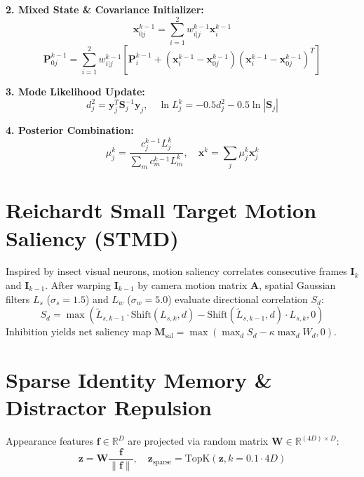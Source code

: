 \documentclass[10pt,journal,compsoc]{IEEEtran}
\begin{document}
\textbf{2. Mixed State \& Covariance Initializer:}
\begin{equation}
\mathbf{x}_{0j}^{k-1} = \sum_{i=1}^2 w_{i|j}^{k-1} \mathbf{x}_i^{k-1}
\end{equation}
\begin{equation}
\mathbf{P}_{0j}^{k-1} = \sum_{i=1}^2 w_{i|j}^{k-1} \left[ \mathbf{P}_i^{k-1} + (\mathbf{x}_i^{k-1} - \mathbf{x}_{0j}^{k-1})(\mathbf{x}_i^{k-1} - \mathbf{x}_{0j}^{k-1})^T \right]
\end{equation}

\textbf{3. Mode Likelihood Update:}
\begin{equation}
d_j^2 = \mathbf{y}_j^T \mathbf{S}_j^{-1} \mathbf{y}_j, \quad \ln L_j^k = -0.5 d_j^2 - 0.5 \ln |\mathbf{S}_j|
\end{equation}

\textbf{4. Posterior Combination:}
\begin{equation}
\mu_j^k = \frac{c_j^{k-1} L_j^k}{\sum_m c_m^{k-1} L_m^k}, \quad \mathbf{x}^k = \sum_j \mu_j^k \mathbf{x}_j^k
\end{equation}

\section{Reichardt Small Target Motion Saliency (STMD)}
Inspired by insect visual neurons, motion saliency correlates consecutive frames $\mathbf{I}_k$ and $\mathbf{I}_{k-1}$. After warping $\mathbf{I}_{k-1}$ by camera motion matrix $\mathbf{A}$, spatial Gaussian filters $L_s$ ($\sigma_s=1.5$) and $L_w$ ($\sigma_w=5.0$) evaluate directional correlation $S_d$:
\begin{equation}
S_d = \max\left( \tilde{L}_{s,k-1} \cdot \text{Shift}(L_{s,k}, d) - \text{Shift}(\tilde{L}_{s,k-1}, d) \cdot L_{s,k}, 0 \right)
\end{equation}
Inhibition yields net saliency map $\mathbf{M}_{\text{sal}} = \max( \max_d S_d - \kappa \max_d W_d, 0 )$.

\section{Sparse Identity Memory \& Distractor Repulsion}
Appearance features $\mathbf{f} \in \mathbb{R}^D$ are projected via random matrix $\mathbf{W} \in \mathbb{R}^{(4D) \times D}$:
\begin{equation}
\mathbf{z} = \mathbf{W} \frac{\mathbf{f}}{\|\mathbf{f}\|}, \quad \mathbf{z}_{\text{sparse}} = \text{TopK}(\mathbf{z}, k=0.1 \cdot 4D)
\end{equation}
\end{document}
